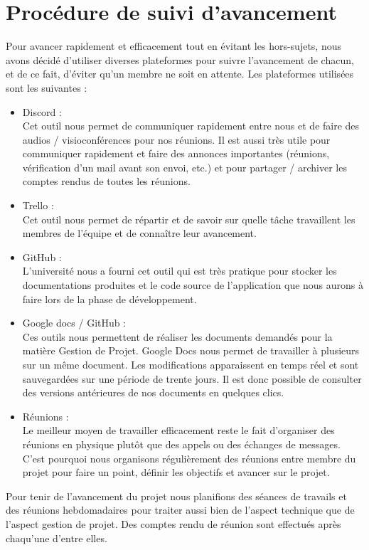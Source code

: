 \chapter{Procédure de suivi d'avancement}

Pour avancer rapidement et efficacement tout en évitant les hors-sujets, nous avons
décidé d’utiliser diverses plateformes pour suivre l’avancement de chacun, et de ce fait,
d’éviter qu’un membre ne soit en attente. Les plateformes utilisées sont les suivantes :\newline

\begin{itemize}
	\item Discord :\\
	Cet outil nous permet de communiquer rapidement entre nous et
    de faire des audios / visioconférences pour nos réunions. Il est aussi très utile
    pour communiquer rapidement et faire des annonces importantes (réunions,
    vérification d’un mail avant son envoi, etc.) et pour partager / archiver les
    comptes rendus de toutes les réunions.\\
	
    \item Trello :\\
	Cet outil nous permet de répartir et de savoir sur quelle tâche
    travaillent les membres de l’équipe et de connaître leur avancement.\\
	
    \item GitHub :\\
	L’université nous a fourni cet outil qui est très pratique pour stocker
    les documentations produites et le code source de l’application que nous
    aurons à faire lors de la phase de développement.\\
	
    \item Google docs / GitHub :\\
	Ces outils nous permettent de réaliser les documents demandés
    pour la matière Gestion de Projet. Google Docs nous permet de travailler à
    plusieurs sur un même document. Les modifications apparaissent en temps
    réel et sont sauvegardées sur une période de trente jours. Il est donc possible
    de consulter des versions antérieures de nos documents en quelques clics.\\
	
    \item Réunions :\\
	Le meilleur moyen de travailler efficacement reste le fait d'organiser des réunions en physique 
	plutôt que des appels ou des échanges de messages. C'est pourquoi nous organisons régulièrement
    des réunions entre membre du projet pour faire un point, définir les objectifs et avancer sur
    le projet. \newline
\end{itemize}

Pour tenir de l'avancement du projet nous planifions des séances de travails et des réunions
hebdomadaires pour traiter aussi bien de l'aspect technique que de l'aspect gestion de projet.
Des comptes rendu de réunion sont effectués après chaqu'une d'entre elles.
